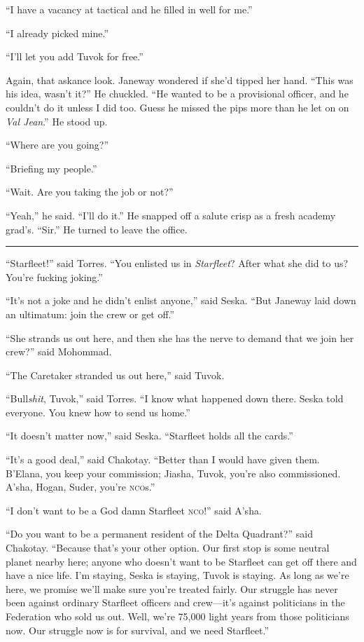 \documentclass[twoside,letterpaper,12pt]{memoir}
\begin{document}
``I have a vacancy at tactical and he filled in well for me.” 

``I already picked mine.” 

``I’ll let you add Tuvok for free.” 

Again, that askance look. Janeway wondered if she’d tipped her hand. ``This was his idea, wasn’t it?” He chuckled. ``He wanted to be a provisional officer, and he couldn’t do it unless I did too. Guess he missed the pips more than he let on on \textit{Val Jean}.” He stood up. 

``Where are you going?” 

``Briefing my people.” 

``Wait. Are you taking the job or not?” 

``Yeah,” he said. ``I’ll do it.” He snapped off a salute crisp as a fresh academy grad’s. ``Sir.” He turned to leave the office. 

\begin{center}\rule{3cm}{0.4 pt}\end{center} 

``Starfleet!” said Torres. ``You enlisted us in \textit{Starfleet}? After what she did to us? You’re fucking joking.” 

``It’s not a joke and he didn’t enlist anyone,” said Seska. ``But Janeway laid down an ultimatum: join the crew or get off.” 

``She strands us out here, and then she has the nerve to demand that we join her crew?” said Mohommad. 

``The Caretaker stranded us out here,” said Tuvok. 

``Bull\textit{shit}, Tuvok,” said Torres. ``I know what happened down there. Seska told everyone. You knew how to send us home.” 

``It doesn’t matter now,” said Seska. ``Starfleet holds all the cards.” 

``It’s a good deal,” said Chakotay. ``Better than I would have given them. B’Elana, you keep your commission; Jiasha, Tuvok, you’re also commissioned. A’sha, Hogan, Suder, you’re \textsc{nco}s.” 

``I don’t want to be a God damn Starfleet \textsc{nco}!” said A’sha. 

``Do you want to be a permanent resident of the Delta Quadrant?” said Chakotay. ``Because that’s your other option. Our first stop is some neutral planet nearby here; anyone who doesn’t want to be Starfleet can get off there and have a nice life. I’m staying, Seska is staying, Tuvok is staying. As long as we’re here, we promise we’ll make sure you’re treated fairly. Our struggle has never been against ordinary Starfleet officers and crew---it’s against politicians in the Federation who sold us out. Well, we’re 75,000 light years from those politicians now. Our struggle now is for survival, and we need Starfleet.” 
\end{document}
